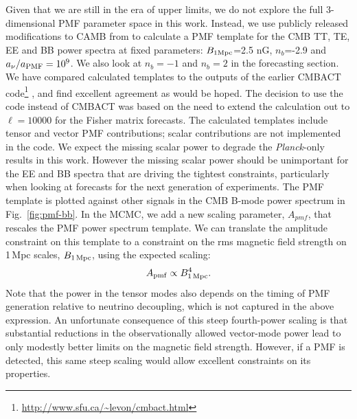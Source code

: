 \documentclass[apj]{emulateapj}
\newcommand{\apmf}{\ensuremath{A_{\rm pmf}}}
\newcommand{\bpmf}{\ensuremath{B_{\rm 1\,Mpc}}}
\newcommand{\be}{\begin{equation}}
\newcommand{\ee}{\end{equation}}
\newcommand{\planck}{{\sl Planck}}
\begin{document}
Given that we are still in the era of upper limits,  we do not explore the full 3-dimensional PMF parameter space in this work. 
Instead, we use publicly released modifications to CAMB from \citet{zucca16} to calculate a PMF template for the CMB TT, TE, EE and BB power spectra at fixed parameters: $B_{\rm{1Mpc}}$=2.5 \rm{nG}, $n_b$=-2.9 and $a_{\nu}/a_{\rm{PMF}}=10^9$. 
We also look at $n_b=-1$ and $n_b=2$ in the forecasting section. 
We have compared calculated templates to the outputs of the earlier CMBACT code\footnote{\url{http://www.sfu.ca/~levon/cmbact.html}} \citep{pogosian99}, and find excellent agreement as would be hoped. 
The decision to use the  \citet{zucca16} code instead of CMBACT was based on the need to extend the calculation out to $\ell=10000$ for the Fisher matrix forecasts. 
The calculated templates include tensor and vector PMF contributions; scalar contributions are not implemented in the code. 
We expect the missing scalar power to degrade the \planck-only results in this work.
However the missing scalar power should be  unimportant for the EE and BB spectra that are driving the tightest constraints, particularly when looking at forecasts for the next generation of experiments. 
The PMF template is plotted against other signals in the CMB B-mode power spectrum in Fig.~\ref{fig:pmf-bb}. 
In the MCMC, we add a new scaling parameter, $A_{pmf}$, that rescales the PMF power spectrum template. 
We can translate the amplitude constraint on this template to a constraint on the rms magnetic field strength on 1\,Mpc scales, \bpmf, using the expected scaling:
\be
\apmf \propto \bpmf^4.
\ee
Note that the power in the tensor modes also depends on the timing of PMF generation relative to neutrino decoupling, which is not captured in the above expression. 
An unfortunate consequence of this steep fourth-power scaling is that substantial reductions in the observationally allowed vector-mode power lead to only modestly better limits on the magnetic field strength. 
However, if a PMF is detected, this same steep scaling would allow excellent constraints on its properties.
\end{document}
